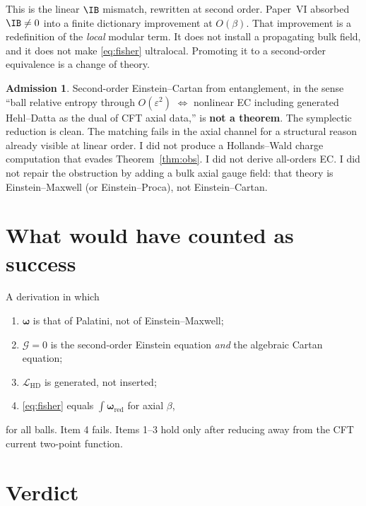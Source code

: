 \documentclass[11pt]{article}
\theoremstyle{definition}
\newtheorem*{admission}{Admission}
\begin{document}
This is the linear $\IB$ mismatch, rewritten at second order.
Paper~VI absorbed $\IB\neq 0$ into a finite dictionary improvement
at $O(\beta)$. That improvement is a redefinition of the
\emph{local} modular term. It does not install a propagating bulk
field, and it does not make \eqref{eq:fisher} ultralocal. Promoting
it to a second-order equivalence is a change of theory.

\begin{admission}
Second-order Einstein--Cartan from entanglement, in the sense
``ball relative entropy through $O(\varepsilon^2)$ $\Leftrightarrow$
nonlinear EC including generated Hehl--Datta as the dual of CFT
axial data,'' is \textbf{not a theorem}. The symplectic reduction
is clean. The matching fails in the axial channel for a structural
reason already visible at linear order. I did not produce a
Hollands--Wald charge computation that evades Theorem~\ref{thm:obs}.
I did not derive all-orders EC. I did not repair the obstruction by
adding a bulk axial gauge field: that theory is Einstein--Maxwell
(or Einstein--Proca), not Einstein--Cartan.
\end{admission}

\section{What would have counted as success}

A derivation in which
\begin{enumerate}[leftmargin=1.6em]
\item $\boldsymbol{\omega}$ is that of Palatini, not of Einstein--Maxwell;
\item $\mathcal{G}=0$ is the second-order Einstein equation \emph{and}
the algebraic Cartan equation;
\item $\mathcal{L}_{\mathrm{HD}}$ is generated, not inserted;
\item \eqref{eq:fisher} equals $\int\boldsymbol{\omega}_{\mathrm{red}}$ for
axial $\beta$,
\end{enumerate}
for all balls. Item 4 fails. Items 1--3 hold only after reducing
away from the CFT current two-point function.

\section{Verdict}
\end{document}
